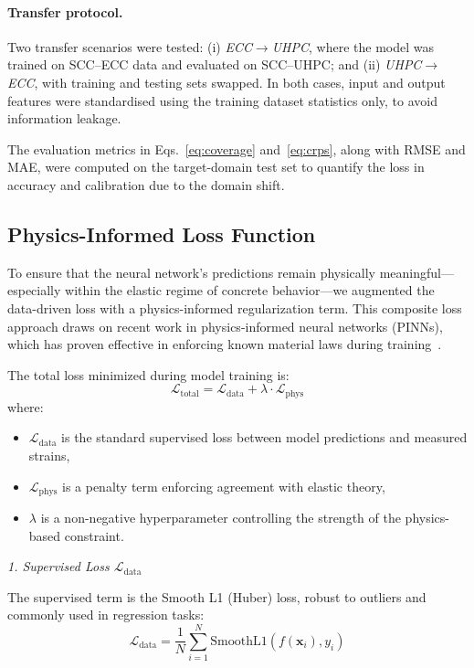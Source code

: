 \documentclass{article}
\begin{document}
\paragraph{Transfer protocol.}
Two transfer scenarios were tested: (i) \emph{ECC$\rightarrow$UHPC}, where the model was trained on SCC--ECC data and evaluated on SCC--UHPC; and (ii) \emph{UHPC$\rightarrow$ECC}, with training and testing sets swapped. In both cases, input and output features were standardised using the training dataset statistics only, to avoid information leakage.

The evaluation metrics in Eqs.~\eqref{eq:coverage} and~\eqref{eq:crps}, along with RMSE and MAE, were computed on the target-domain test set to quantify the loss in accuracy and calibration due to the domain shift.


\subsection{Physics-Informed Loss Function}

To ensure that the neural network’s predictions remain physically meaningful—especially within the elastic regime of concrete behavior—we augmented the data-driven loss with a physics-informed regularization term. This composite loss approach draws on recent work in physics-informed neural networks (PINNs), which has proven effective in enforcing known material laws during training~\cite{raissi2019physics, han2025msc, fan2023pinn}.

The total loss minimized during model training is:
\begin{equation}
\mathcal{L}_{\mathrm{total}} = \mathcal{L}_{\mathrm{data}} + \lambda \cdot \mathcal{L}_{\mathrm{phys}}
\end{equation}
where:
\begin{itemize}
    \item $\mathcal{L}_{\mathrm{data}}$ is the standard supervised loss between model predictions and measured strains,
    \item $\mathcal{L}_{\mathrm{phys}}$ is a penalty term enforcing agreement with elastic theory,
    \item $\lambda$ is a non-negative hyperparameter controlling the strength of the physics-based constraint.
\end{itemize}

\vspace{1em}
\noindent
\emph{1. Supervised Loss $\mathcal{L}_{\mathrm{data}}$}

The supervised term is the Smooth L1 (Huber) loss, robust to outliers and commonly used in regression tasks:
\begin{equation}
\mathcal{L}_{\mathrm{data}} = \frac{1}{N} \sum_{i=1}^{N} \mathrm{SmoothL1}(f(\mathbf{x}_i), y_i)
\end{equation}
\end{document}
